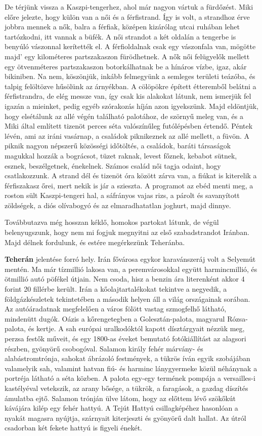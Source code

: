 De térjünk vissza a Kaszpi-tengerhez, ahol már nagyon vártuk a
fürdőzést. Miki előre jelezte, hogy külön van a női és a férfistrand. Így
is volt, a strandhoz érve jobbra mennek a nők, balra a férfiak, középen
kizárólag utcai ruhában lehet tartózkodni, itt vannak a büfék. A női
strandot a két oldalán a tengerbe is benyúló vászonnal kerítették el.
A férfioldalnak csak egy vászonfala van, mögötte majd' egy kilométeres
partszakaszon fürödhetnek. A nők női felügyelők mellett egy
ötvenméteres partszakaszon botorkálhatnak be a hínáros vízbe, igaz,
akár bikiniben. Na nem, köszönjük, inkább felmegyünk a semleges területi
teázóba, és talpig felöltözve hűsölünk az árnyékban. A cölöpökre
épített étteremből belátni a férfistrandra, de elég messze van, így csak
kis alakokat látunk, nem ismerjük fel igazán a mieinket, pedig egyéb
szórakozás híján azon igyekszünk. Majd eldöntjük, hogy elsétálunk az
allé végén található palotához, de szörnyű meleg van, és a Miki által
említett tizenöt perces séta valószínűleg futólépésben értendő. Péntek
lévén, ami az iráni vasárnap, a családok piknikeznek az allé mellett,
a füvön. A piknik nagyon népszerű közösségi időtöltés, a családok,
baráti társaságok magukkal hozzák a bográcsot, tüzet raknak, levest
főznek, kebabot sütnek, esznek, beszélgetnek, énekelnek. Számos család
női tagja odaint, hogy csatlakozzunk. A strand dél és tizenöt óra
között zárva van, a fiúkat is kiterelik a férfiszakasz őrei, mert nekik is
jár a szieszta. A programot az ebéd menti meg, a roston sült Kaszpi-tengeri
hal, a sáfrányos vajas rizs, a párolt és savanyított zöldségek,
a diós olívabogyó és az elmaradhatatlan joghurt, majd dinnye.

Továbbutazva még hosszan kéklő, homokos partokat látunk, de
végül belenyugszunk, hogy nem mi fogjuk megnyitni az első szabadstrandot
Iránban. Majd délnek fordulunk, és estére megérkezünk Teheránba.

\textbf{Teherán} jelentése forró hely. Irán fővárosa egykor karavánszeráj
volt a Selyemút mentén. Ma már tízmillió lakosa van, a peremvárosokkal
együtt harmincmillió, és ötmillió autó pöfékel útjain. Nem csoda,
hisz a benzin ára literenként akkor 4 forint 20 fillérbe került. Irán a
kőolajtartalékokat tekintve a negyedik, a földgázkészletek tekintetében
a második helyen áll a világ országainak sorában. Az autóáradatnak
megfelelően a város fölött vastag szmogfelhő látható, mindenütt
dugók. Oázis a kőrengetegben a Golesztán-palota, magyarul Rózsa-palota,
és kertje. A sah európai uralkodóktól kapott dísztárgyait nézzük
meg, perzsa festők műveit, és egy 1800-as éveket bemutató fotókiállítást
az alagsori részben, gyönyörű csobogóval. Salamon király
fehér márvány- és alabástromtrónja, sahokat ábrázoló festmények,
a tükrös íván egyik szobájában valamelyik sah, valamint hatvan fiú-
és harminc lánygyermeke közül néhánynak a portréja látható a séta
közben. A palota egy-egy termének pompája a versailles-i kastélyéval
vetekszik, az arany bősége, a tükrök, a faragások, a gazdag díszítés
ámulatba ejtő. Salamon trónján ülve látom, hogy az előttem lévő szökőkút
kávájára kilép egy fehér hattyú. A Tejút Hattyú csillagképéhez
hasonlóan a nyakát magasra nyújtja, szárnyait kiterjeszti és gyönyörű
dalt hallat. Az útról csadorban két fekete hattyú is figyeli énekét.

